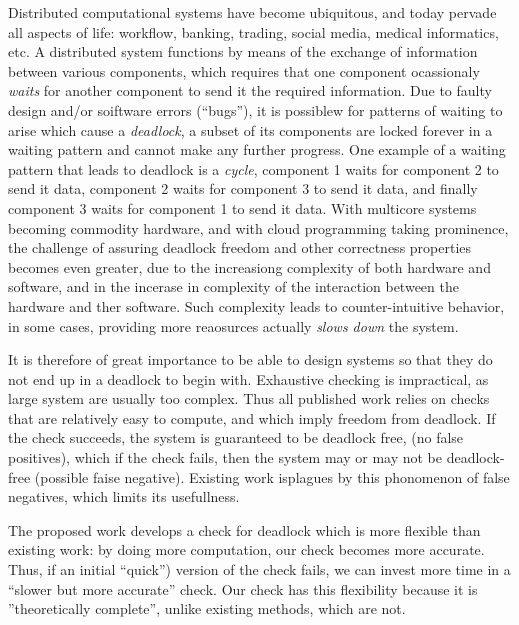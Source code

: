 Distributed computational systems have become ubiquitous, and today pervade all aspects of life: workflow, banking, trading, 
social media, medical informatics, etc.
%
A distributed system functions by means of the exchange of information between various components, which requires 
that one component ocassionaly \emph{waits} for another component to send it the required information. 
Due to faulty design and/or soiftware errors (``bugs''), it is possiblew for patterns of waiting to arise which cause a 
{\em deadlock}, \ie a subset of its components are locked forever in a waiting pattern and cannot make any further progress.
%
One example of a waiting pattern that leads to deadlock is a \emph{cycle}, \eg component 1 waits for component 2 to send it data, 
component 2 waits for component 3 to send it data, and finally 
component 3 waits for component 1 to send it data.
%
%
With multicore systems becoming commodity hardware, and with cloud programming taking prominence, the challenge
of assuring deadlock freedom and other correctness properties becomes even greater,  due to the increasiong complexity of both hardware and software,
and in the incerase in complexity of the interaction between the hardware and ther software. Such complexity leads to counter-intuitive behavior, \eg
in some cases, providing more reaosurces actually \emph{slows down} the system.

It is therefore of great importance to be able to design systems so that they do not end up in a deadlock to begin with. 
Exhaustive checking is impractical, as large system are usually too complex. Thus all published work relies on checks that are 
relatively easy to compute, and which imply freedom from deadlock. If the check succeeds, the system is guaranteed to be deadlock free, (no false
positives), which if the check fails, then the system may or may not be deadlock-free (possible faise negative).  Existing work isplagues by this
phonomenon of false negatives, which limits its usefullness.

The proposed work develops a check for deadlock which is more flexible than existing work: by doing more computation, our check becomes more 
accurate. Thus, if an initial ``quick'') version of the check fails, we can invest more time in a ``slower but more accurate'' check. 
Our check has this flexibility because it is ''theoretically complete'', unlike existing methods, which are not.



%
